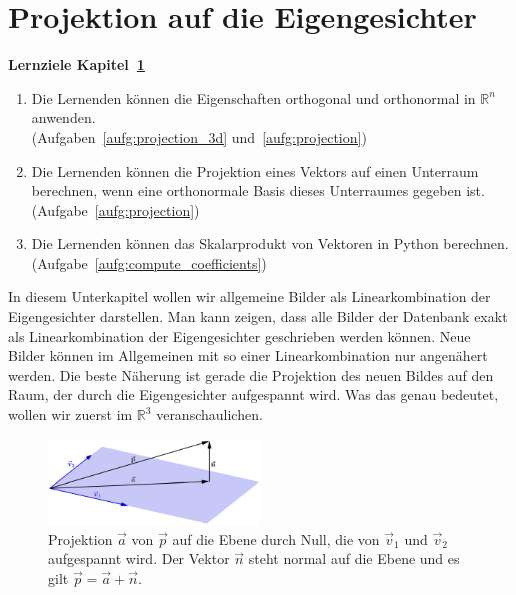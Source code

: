 \section{Projektion auf die Eigengesichter} \label{sec:eigenbasis}
\begin{tcolorbox}
	\centerline{\textbf{Lernziele Kapitel~\ref{sec:eigenbasis}}}
	\begin{enumerate}[leftmargin=*,label=\thesection.\arabic*]
		\item \label{item:projection_3d} Die Lernenden können die Eigenschaften \glqq{}orthogonal\grqq{} und \glqq{}orthonormal\grqq{} in $\mathbb R^n$ anwenden.\\
		(Aufgaben~\ref{aufg:projection_3d} und~\ref{aufg:projection})
		\item \label{item:projection} Die Lernenden können die Projektion eines Vektors auf einen Unterraum berechnen, wenn eine orthonormale Basis dieses Unterraumes gegeben ist.\\
		(Aufgabe~\ref{aufg:projection})
		\item \label{item:compute_coefficients} Die Lernenden können das Skalarprodukt von Vektoren in Python berechnen.\\
		(Aufgabe~\ref{aufg:compute_coefficients})
	\end{enumerate}
\end{tcolorbox}
In diesem Unterkapitel wollen wir allgemeine Bilder als Linearkombination der Eigengesichter darstellen.
Man kann zeigen, dass alle Bilder der Datenbank exakt als Linearkombination der Eigengesichter geschrieben werden können.
Neue Bilder können im Allgemeinen mit so einer Linearkombination nur angenähert werden.
Die beste Näherung ist gerade die Projektion des neuen Bildes auf den Raum, der durch die Eigengesichter aufgespannt wird.
Was das genau bedeutet, wollen wir zuerst im $\mathbb R^3$ veranschaulichen.
\begin{figure}[ht]
	\centering
	\includegraphics[width=0.5\textwidth]{images/projection}
	\caption{Projektion $\vec a$ von $\vec p$ auf die Ebene durch Null, die von $\vec v_1$ und $\vec v_2$ aufgespannt wird. Der Vektor $\vec n$ steht normal auf die Ebene und es gilt $\vec p=\vec a+\vec n$.}
	\label{fig:projection}
\end{figure}
